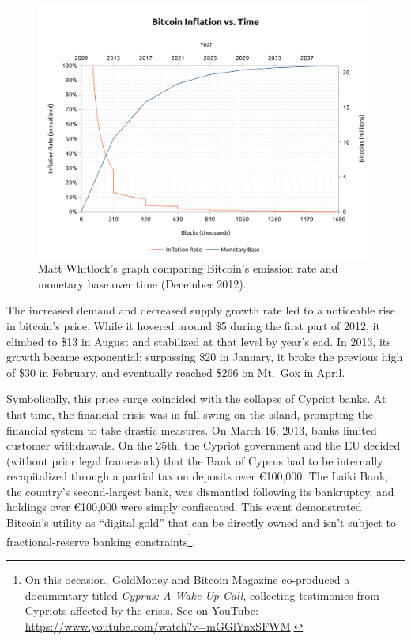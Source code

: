 \documentclass[
  a5paper,
  smalldemyvopaper,10pt,twoside,onecolumn,openright,extrafontsizes,hidelinks]{memoir}
\begin{document}
\begin{figure}

{\centering \includegraphics{chapters/img/matt-whitlock-bitcoin-inflation-log.png}

}

\caption{Matt Whitlock's graph comparing Bitcoin's emission rate and
monetary base over time (December 2012).}

\end{figure}%

The increased demand and decreased supply growth rate led to a
noticeable rise in bitcoin's price. While it hovered around \$5 during
the first part of 2012, it climbed to \$13 in August and stabilized at
that level by year's end. In 2013, its growth became exponential:
surpassing \$20 in January, it broke the previous high of \$30 in
February, and eventually reached \$266 on Mt.~Gox in April.

Symbolically, this price surge coincided with the collapse of Cypriot
banks. At that time, the financial crisis was in full swing on the
island, prompting the financial system to take drastic measures. On
March 16, 2013, banks limited customer withdrawals. On the 25th, the
Cypriot government and the EU decided (without prior legal framework)
that the Bank of Cyprus had to be internally recapitalized through a
partial tax on deposits over €100,000. The Laiki Bank, the country's
second-largest bank, was dismantled following its bankruptcy, and
holdings over €100,000 were simply confiscated. This event demonstrated
Bitcoin's utility as ``digital gold'' that can be directly owned and
isn't subject to fractional-reserve banking constraints\footnote{On this
  occasion, GoldMoney and Bitcoin Magazine co-produced a documentary
  titled \emph{Cyprus: A Wake Up Call}, collecting testimonies from
  Cypriots affected by the crisis. See on YouTube:
  \url{https://www.youtube.com/watch?v=mGGlYnxSFWM}.}.
\end{document}

